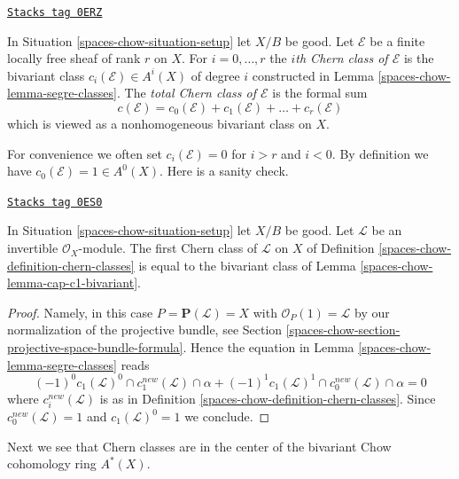 \begin{definition}
\label{spaces-chow-definition-chern-classes}
\href{https://stacks.math.columbia.edu/tag/0ERZ}{\texttt{Stacks tag 0ERZ}}

In Situation \ref{spaces-chow-situation-setup} let $X/B$ be good.
Let $\mathcal{E}$ be a finite locally free sheaf of rank $r$ on $X$.
For $i = 0, \ldots, r$ the {\it $i$th Chern class of $\mathcal{E}$}
is the bivariant class $c_i(\mathcal{E}) \in A^i(X)$ of degree $i$
constructed in Lemma \ref{spaces-chow-lemma-segre-classes}.
The {\it total Chern class of $\mathcal{E}$}
is the formal sum
$$
c(\mathcal{E}) =
c_0(\mathcal{E}) + c_1(\mathcal{E}) + \ldots + c_r(\mathcal{E})
$$
which is viewed as a nonhomogeneous bivariant class on $X$.
\end{definition}

For convenience we often set $c_i(\mathcal{E}) = 0$
for $i > r$ and $i < 0$. By definition
we have $c_0(\mathcal{E}) = 1 \in A^0(X)$.
Here is a sanity check.

\begin{lemma}
\label{spaces-chow-lemma-first-chern-class}
\href{https://stacks.math.columbia.edu/tag/0ES0}{\texttt{Stacks tag 0ES0}}

In Situation \ref{spaces-chow-situation-setup} let $X/B$ be good.
Let $\mathcal{L}$ be an invertible $\mathcal{O}_X$-module.
The first Chern class of $\mathcal{L}$ on $X$ of
Definition \ref{spaces-chow-definition-chern-classes}
is equal to the bivariant class of Lemma \ref{spaces-chow-lemma-cap-c1-bivariant}.
\end{lemma}

\begin{proof}
Namely, in this case $P = \mathbf{P}(\mathcal{L}) = X$ with
$\mathcal{O}_P(1) = \mathcal{L}$ by our normalization of the
projective bundle, see Section \ref{spaces-chow-section-projective-space-bundle-formula}.
Hence the equation in Lemma \ref{spaces-chow-lemma-segre-classes}
reads
$$
(-1)^0 c_1(\mathcal{L})^0 \cap c^{new}_1(\mathcal{L}) \cap \alpha +
(-1)^1 c_1(\mathcal{L})^1 \cap c^{new}_0(\mathcal{L}) \cap \alpha = 0
$$
where $c_i^{new}(\mathcal{L})$ is as in
Definition \ref{spaces-chow-definition-chern-classes}.
Since $c_0^{new}(\mathcal{L}) = 1$ and $c_1(\mathcal{L})^0 = 1$
we conclude.
\end{proof}

Next we see that Chern classes are in the center of the bivariant
Chow cohomology ring $A^*(X)$.


